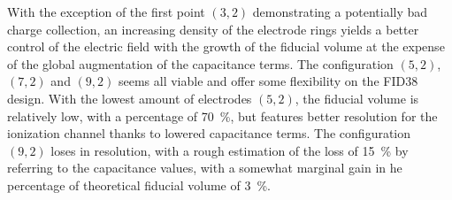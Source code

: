 With the exception of the first point $(3,2)$ demonstrating a potentially bad charge collection, an increasing density of the electrode rings yields a better control of the electric field with the growth of the fiducial volume at the expense of the global augmentation of the capacitance terms. The configuration $(5,2)$, $(7,2)$ and $(9,2)$ seems all viable and offer some flexibility on the FID38 design. With the lowest amount of electrodes $(5,2)$, the fiducial volume is relatively low, with a percentage of \SI{70}{\percent}, but features better resolution for the ionization channel thanks to lowered capacitance terms. The configuration $(9,2)$ loses in resolution, with a rough estimation of the loss of \SI{15}{\percent} by referring to the capacitance values, with a somewhat marginal gain in he percentage of theoretical fiducial volume of \SI{3}{\percent}.
